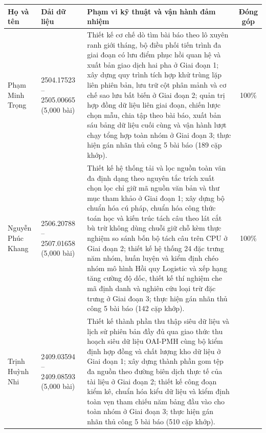 \begin{table}[H]
    \centering
    \scriptsize
    \setlength{\tabcolsep}{4pt}
    \renewcommand{\arraystretch}{1.05}
    \begin{tabularx}{\textwidth}{l p{} X c}
        \toprule
        \textbf{Họ và tên} & \textbf{Dải dữ liệu} &
        \textbf{Phạm vi kỹ thuật và vận hành đảm nhiệm} & \textbf{Đóng góp} \\
        \midrule
        Phạm Minh Trọng & 2504.17523 -- 2505.00665 \newline (5{,}000 bài)
            & Thiết kế cơ chế dò tìm bài báo theo lô xuyên ranh giới tháng, bộ điều phối tiến trình đa giai đoạn có lưu điểm phục hồi quan hệ và xuất bản giao dịch hai pha ở Giai đoạn 1; xây dựng quy trình tích hợp khử trùng lặp liên phiên bản, lưu trữ cột phân mảnh và cơ chế sao lưu bất biến ở Giai đoạn 2; quản trị hợp đồng dữ liệu liên giai đoạn, chiến lược chọn mẫu, chia tập theo bài báo, xuất bản sáu bảng dữ liệu cuối cùng và vận hành lượt chạy tổng hợp toàn nhóm ở Giai đoạn 3; thực hiện gán nhãn thủ công 5 bài báo (189 cặp khớp).
            & 100\% \\
        \midrule
        Nguyễn Phúc Khang & 2506.20788 -- 2507.01658 \newline (5{,}000 bài)
            & Thiết kế hệ thống tải và lọc nguồn toàn văn đa định dạng theo nguyên tắc trích xuất chọn lọc chỉ giữ mã nguồn văn bản và thư mục tham khảo ở Giai đoạn 1; xây dựng bộ chuẩn hóa cú pháp, chuẩn hóa công thức toán học và kiến trúc tách câu theo lát cắt bù trừ không dùng chuỗi giữ chỗ kèm thực nghiệm so sánh bốn bộ tách câu trên CPU ở Giai đoạn 2; thiết kế hệ thống 24 đặc trưng năm nhóm, huấn luyện và kiểm định chéo nhóm mô hình Hồi quy Logistic và xếp hạng tăng cường độ dốc, thiết kế thí nghiệm che mã định danh và nghiên cứu loại trừ đặc trưng ở Giai đoạn 3; thực hiện gán nhãn thủ công 5 bài báo (142 cặp khớp).
            & 100\% \\
        \midrule
        Trịnh Huỳnh Nhi & 2409.03594 -- 2409.08593 \newline (5{,}000 bài)
            & Thiết kế thành phần thu thập siêu dữ liệu và lịch sử phiên bản đầy đủ qua giao thức thu hoạch siêu dữ liệu OAI-PMH cùng bộ kiểm định hợp đồng và chất lượng kho dữ liệu ở Giai đoạn 1; xây dựng thành phần gom tệp đa nguồn theo đường biên dịch thực tế của tài liệu ở Giai đoạn 2; thiết kế công đoạn kiểm kê, chuẩn hóa kiểu dữ liệu và kiểm định toàn vẹn tham chiếu năm bảng đầu vào cho toàn nhóm ở Giai đoạn 3; thực hiện gán nhãn thủ công 5 bài báo (510 cặp khớp).

\end{tabularx}
\end{table}
